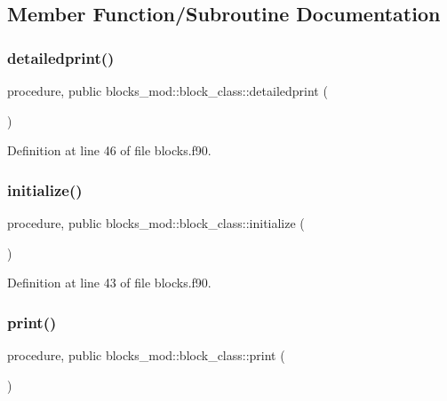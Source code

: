 \subsection{Member Function/\+Subroutine Documentation}
\mbox{\label{structblocks__mod_1_1block__class_a937d8dca8393460bc718dafa8a5c03ac}} 
\subsubsection{\texorpdfstring{detailedprint()}{detailedprint()}}
{\footnotesize\ttfamily procedure, public blocks\+\_\+mod\+::block\+\_\+class\+::detailedprint (\begin{DoxyParamCaption}{ }\end{DoxyParamCaption})}



Definition at line 46 of file blocks.\+f90.

\mbox{\label{structblocks__mod_1_1block__class_ad671745ca5dc3227ddb0ed1d9ff45268}} 
\subsubsection{\texorpdfstring{initialize()}{initialize()}}
{\footnotesize\ttfamily procedure, public blocks\+\_\+mod\+::block\+\_\+class\+::initialize (\begin{DoxyParamCaption}{ }\end{DoxyParamCaption})}



Definition at line 43 of file blocks.\+f90.

\mbox{\label{structblocks__mod_1_1block__class_a43b4c133934eaadb55d30cf834d1e28c}} 
\subsubsection{\texorpdfstring{print()}{print()}}
{\footnotesize\ttfamily procedure, public blocks\+\_\+mod\+::block\+\_\+class\+::print (\begin{DoxyParamCaption}{ }\end{DoxyParamCaption})}



